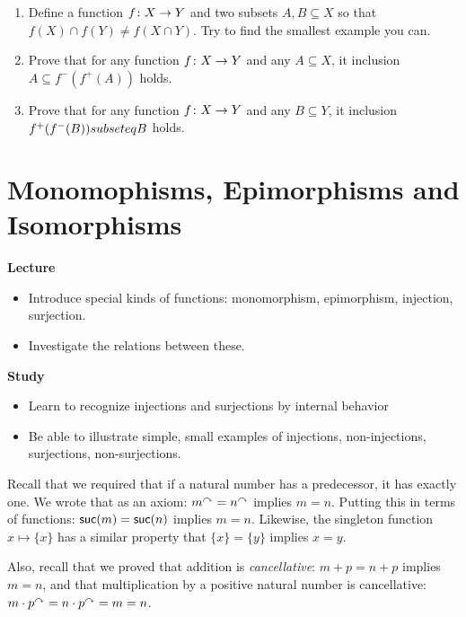 \begin{exercises}
	\begin{enumerate}
		\item Define a function ${f}\colon{X}\to{Y}$ and two subsets $A,B\subseteq X$ so that $f(X)\cap f(Y) \neq f(X\cap Y)$. Try to find the smallest example you can.
		\item Prove that for any function ${f}\colon{X}\to{Y}$ and any $A\subseteq X$, it inclusion $A\subseteq f^-(f^+(A))$ holds.
		\item Prove that for any function ${f}\colon{X}\to{Y}$ and any $B\subseteq Y$, it inclusion $f^+(f^-(B))\\subseteq B$ holds.
	\end{enumerate}
\end{exercises}

\chapter{Monomophisms, Epimorphisms and Isomorphisms}

\begin{goals}
	\noindent\textbf{Lecture}
	\begin{itemize}
		\item Introduce special kinds of functions: monomorphism, epimorphism, injection, surjection.
		\item Investigate the relations between these.
	\end{itemize}
	
	\noindent\textbf{Study}
	\begin{itemize}
		\item Learn to recognize injections and surjections by internal behavior
		\item Be able to illustrate simple, small examples of injections, non-injections, surjections, non-surjections.
	\end{itemize}
\end{goals}

Recall that we required that if a natural number has a predecessor, it has exactly one. 
We wrote that as an axiom: $m^\curvearrowright = n^\curvearrowright$ implies $m=n$.
Putting this in terms of functions: $\mathord{\textsf{suc}}(m) = \mathord{\textsf{suc}}(n)$ implies $m=n$.
Likewise, the singleton function $x\mapsto \{x\}$ has a similar property that $\{x\}=\{y\}$ implies $x= y$.

Also, recall that we proved that addition is \emph{cancellative}: $m+p = n+p$
implies $m=n$, and that multiplication by a positive natural number is cancellative:
$m\cdot p^\curvearrowright = n\cdot p^\curvearrowright = m=n$.

